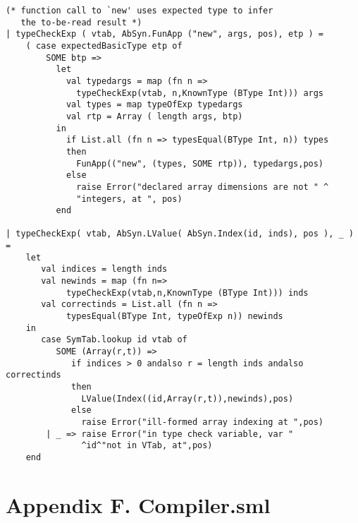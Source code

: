 \documentclass[12pt,a4paper,english]{article}
\begin{document}
\begin{lstlisting}[caption=changes in type.sml for task 3 and 4.]
(* function call to `new' uses expected type to infer
   the to-be-read result *)
| typeCheckExp ( vtab, AbSyn.FunApp ("new", args, pos), etp ) =
    ( case expectedBasicType etp of
        SOME btp => 
          let 
            val typedargs = map (fn n => 
		      typeCheckExp(vtab, n,KnownType (BType Int))) args
            val types = map typeOfExp typedargs
            val rtp = Array ( length args, btp)
          in
            if List.all (fn n => typesEqual(BType Int, n)) types
            then 
              FunApp(("new", (types, SOME rtp)), typedargs,pos)
            else 
              raise Error("declared array dimensions are not " ^
			  "integers, at ", pos)
          end

| typeCheckExp( vtab, AbSyn.LValue( AbSyn.Index(id, inds), pos ), _ ) =
    let
       val indices = length inds
       val newinds = map (fn n=>
			typeCheckExp(vtab,n,KnownType (BType Int))) inds
       val correctinds = List.all (fn n => 
			typesEqual(BType Int, typeOfExp n)) newinds
    in
       case SymTab.lookup id vtab of
          SOME (Array(r,t)) => 
             if indices > 0 andalso r = length inds andalso correctinds 
             then
               LValue(Index((id,Array(r,t)),newinds),pos)
             else
               raise Error("ill-formed array indexing at ",pos)
        | _ => raise Error("in type check variable, var " 
			   ^id^"not in VTab, at",pos)
    end
\end{lstlisting}

\newpage
\section{Appendix F. Compiler.sml}
\end{document}
